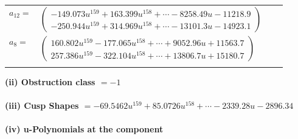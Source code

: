 \documentclass[1p]{elsarticle_modified}
\theoremstyle{definition}
\begin{document}
\begin{tabular}{m{7pt} m{180pt} m{7pt} m{180pt} }
\flushright $a_{12}=$&$\begin{pmatrix}-149.073 u^{159}+163.399 u^{158}+\cdots-8258.49 u-11218.9\\-250.944 u^{159}+314.969 u^{158}+\cdots-13101.3 u-14923.1\end{pmatrix}$ \\
\flushright $a_{8}=$&$\begin{pmatrix}160.802 u^{159}-177.065 u^{158}+\cdots+9052.96 u+11563.7\\257.386 u^{159}-322.104 u^{158}+\cdots+13806.7 u+15180.7\end{pmatrix}$\\&\end{tabular}
\flushleft \textbf{(ii) Obstruction class $= -1$}\\~\\
\flushleft \textbf{(iii) Cusp Shapes $= -69.5462 u^{159}+85.0726 u^{158}+\cdots-2339.28 u-2896.34$}\\~\\
\newpage\renewcommand{\arraystretch}{1}
\flushleft \textbf{(iv) u-Polynomials at the component}\newline \\
\end{document}
